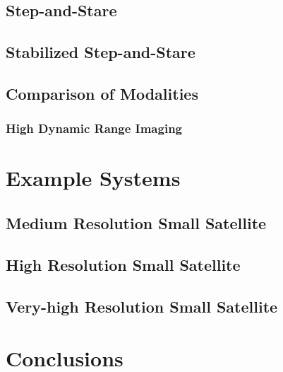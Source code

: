 \documentclass[10pt,journal]{IEEEtran}  %
\begin{document}
\subsection{Step-and-Stare}
\label{sec:step_stare}

\subsection{Stabilized Step-and-Stare}
\label{sec:stab_step_stare}

\subsection{Comparison of Modalities}
\label{sec:comp_modalities}

\subsubsection{High Dynamic Range Imaging}
\label{sec:hdr}

\section{Example Systems}
\label{sec:examples}

\subsection{Medium Resolution Small Satellite}
\label{sec:med_res}

\subsection{High Resolution Small Satellite}
\label{sec:high_res}

\subsection{Very-high Resolution Small Satellite}
\label{sec:vhigh_res}

\section{Conclusions}
\label{sec:conclusions}


\end{document}
